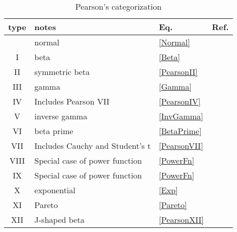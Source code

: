 \begin{table}
\begin{center}
\caption{Pearson's categorization}
\label{PearsonTypesTable}
\begin{tabular}{clll}
\\
type & notes & Eq. & Ref.\\
\hline
 & normal & \eqref{Normal} & \cite{Pearson1895}  \\
I  & beta & \eqref{Beta} & \cite{Pearson1895}  \\
II &  symmetric beta & \eqref{PearsonII} & \cite{Pearson1895}  \\
III  &   gamma & \eqref{Gamma}& \cite{Pearson1893}  \\
IV  & Includes Pearson VII & \eqref{PearsonIV}& \cite{Pearson1895}  \\
V   &  inverse gamma & \eqref{InvGamma}& \cite{Pearson1901}  \\
VI   & beta prime &  \eqref{BetaPrime} & \cite{Pearson1901}  \\
VII   & Includes Cauchy and Student's t  &\eqref{PearsonVII} & \cite{Pearson1916}  \\ 
VIII   & Special case of power function & \eqref{PowerFn} & \cite{Pearson1916}  \\
IX  & Special case of power function & \eqref{PowerFn} & \cite{Pearson1916}  \\
X   & exponential & \eqref{Exp} & \cite{Pearson1916}  \\
XI   & Pareto & \eqref{Pareto} & \cite{Pearson1916}  \\
XII   & J-shaped beta  &\eqref{PearsonXII} & \cite{Pearson1916}  \\
\end{tabular}
\end{center}
\end{table}




